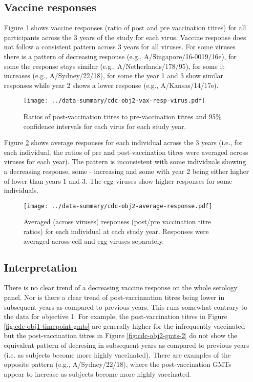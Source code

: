 \documentclass[12pt]{article}
\begin{document}
\subsection{Vaccine responses}

Figure \ref{fig:cdc-obj2-vax-resp-virus} shows vaccine responses (ratio of post and pre vaccination titres)
for all participants across the 3 years of the study for each virus. Vaccine
response does not follow a consistent pattern across 3 years for all viruses. For some viruses
there is a pattern of decreasing response (e.g., A/Singapore/16-0019/16e), for some the response stays similar (e.g., A/Netherlands/178/95), for some it increases
(e.g., A/Sydney/22/18), for some the year 1 and 3 show similar responses while
year 2 shows a lower response (e.g., A/Kansas/14/17e).

\begin{figure}
	\texttt{[image: ../data-summary/cdc-obj2-vax-resp-virus.pdf]}
	\caption{Ratios of post-vaccination titres to pre-vaccination titres and 95\% confidence intervals for each virus for each study year.}
	\label{fig:cdc-obj2-vax-resp-virus}
\end{figure}

Figure \ref{fig:cdc-obj2-average-response} shows average responses for each individual across the 3 years (i.e., for each individual, the ratios of pre and post-vaccination titres were averaged across viruses for each year).
The pattern is inconsistent with some individuals showing a decreasing response,
some - increasing and some with year 2 being either higher of lower
than years 1 and 3.
The egg viruses show higher responses for some individuals.

\begin{figure}
	\texttt{[image: ../data-summary/cdc-obj2-average-response.pdf]}
	\caption{Averaged (across viruses) responses (post/pre vaccination titre ratios) for each individual at each study year. Responses were averaged across cell and egg viruses separately.}
	\label{fig:cdc-obj2-average-response}
\end{figure}

\subsection{Interpretation}

There is no clear trend of a decreasing vaccine response on the whole serology
panel. Nor is there a clear trend of post-vaccianation titres being lower in subsequent years as compared to previous years. This runs somewhat contrary to
the data for objective 1. For example, the post-vaccination titres in Figure \ref{fig:cdc-obj1-timepoint-gmts} are generally higher for the infrequently vaccinated but the post-vaccination titres in Figure \ref{fig:cdc-obj2-gmts-2} do not show the equivalent pattern of decresing in subsequent years as compared to previous years (i.e. as subjects become more highly vaccinated). There are examples of the opposite pattern (e.g., A/Sydney/22/18), where the post-vaccination GMTs appear to increase as subjects become more highly vaccinated.
\end{document}
